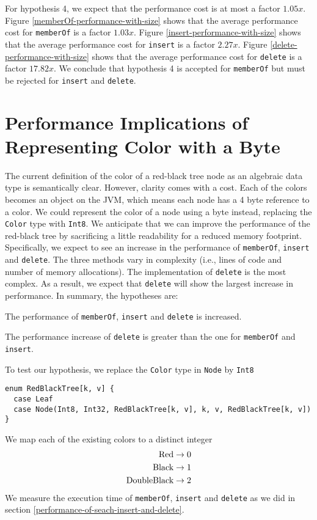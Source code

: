 \documentclass[../main.tex]{subfiles}
\begin{document}
For hypothesis 4, we expect that the performance cost is at most a factor $1.05x$. Figure \ref{memberOf-performance-with-size} shows that the average performance cost for \lstinline{memberOf} is a factor $1.03x$. Figure \ref{insert-performance-with-size} shows that the average performance cost for \lstinline{insert} is a factor $2.27x$. Figure \ref{delete-performance-with-size} shows that the average performance cost for \lstinline{delete} is a factor $17.82x$. We conclude that hypothesis 4 is accepted for \lstinline{memberOf} but must be rejected for \lstinline{insert} and \lstinline{delete}.

\section{Performance Implications of Representing Color with a Byte}

The current definition of the color of a red-black tree node as an algebraic data type is semantically clear. However, clarity comes with a cost. Each of the colors becomes an object on the JVM, which means each node has a 4 byte reference to a color. We could represent the color of a node using a byte instead, replacing the \lstinline{Color} type with \lstinline{Int8}. We anticipate that we can improve the performance of the red-black tree by sacrificing a little readability for a reduced memory footprint. Specifically, we expect to see an increase in the performance of \lstinline{memberOf}, \lstinline{insert} and \lstinline{delete}. The three methods vary in complexity (i.e., lines of code and number of memory allocations). The implementation of \lstinline{delete} is the most complex. As a result, we expect that \lstinline{delete} will show the largest increase in performance. In summary, the hypotheses are:

\begin{hypothesis}
The performance of \lstinline{memberOf}, \lstinline{insert} and \lstinline{delete} is increased.
\end{hypothesis}

\begin{hypothesis}
The performance increase of \lstinline{delete} is greater than the one for \lstinline{memberOf} and \lstinline{insert}.
\end{hypothesis}

To test our hypothesis, we replace the \lstinline{Color} type in \lstinline{Node} by \lstinline{Int8}
\begin{lstlisting}[language=Flix]
enum RedBlackTree[k, v] {
  case Leaf
  case Node(Int8, Int32, RedBlackTree[k, v], k, v, RedBlackTree[k, v])
}
\end{lstlisting}
We map each of the existing colors to a distinct integer
\begin{align*}
\lstinline{Red} \rightarrow 0\\
\lstinline{Black} \rightarrow 1\\
\lstinline{DoubleBlack} \rightarrow 2
\end{align*}
We measure the execution time of \lstinline{memberOf}, \lstinline{insert} and \lstinline{delete} as we did in section \ref{performance-of-seach-insert-and-delete}.
\end{document}
